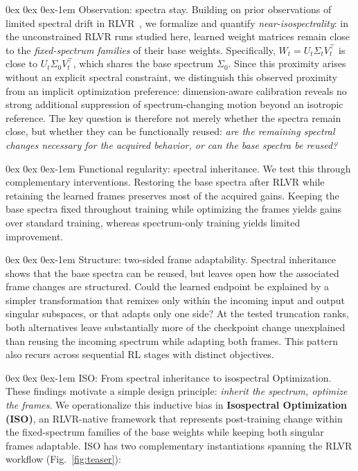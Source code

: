 \documentclass[11pt, a4paper]{utda}
\makeatletter
\renewcommand{\paragraph}{%
  \@startsection{paragraph}{4}%
  {\z@}{0ex \@plus 0ex \@minus 0ex}{-1em}%
  {\normalfont\normalsize\bfseries}%
}
\theoremstyle{plain}
\theoremstyle{definition}
\theoremstyle{remark}
\makeatother
\begin{document}
\paragraph{Observation: spectra stay.}
Building on prior observations of limited spectral drift in
RLVR~\cite{zhu2025path}, we formalize and quantify
\emph{near-isospectrality}: in the unconstrained RLVR runs studied
here, learned weight matrices remain close to the
\emph{fixed-spectrum families} of their base weights.
Specifically, $W_t=U_t\Sigma_tV_t^\top$ is close to
$U_t\Sigma_0V_t^\top$, which shares the base spectrum $\Sigma_0$.
Since this proximity arises without an explicit spectral constraint,
we distinguish this observed proximity from an implicit
optimization preference: dimension-aware calibration reveals
no strong additional suppression of spectrum-changing motion
beyond an isotropic reference.
The key question is therefore not merely whether the spectra
remain close, but whether they can be functionally reused:
\emph{are the remaining spectral changes necessary for the
acquired behavior, or can the base spectra be reused?}


\paragraph{Functional regularity: spectral inheritance.}
We test this through complementary interventions.
Restoring the base spectra after RLVR while retaining the learned frames preserves most of the acquired gains.
Keeping the base spectra fixed throughout training while optimizing the frames yields gains over standard training, whereas spectrum-only training yields limited improvement.

\paragraph{Structure: two-sided frame adaptability.}
Spectral inheritance shows that the base spectra can be reused, but leaves open how the associated frame changes are structured.
Could the learned endpoint be explained by a simpler transformation that remixes only within the incoming input and output singular subspaces, or that adapts only one side?
At the tested truncation ranks, both alternatives leave substantially more of the checkpoint change unexplained than reusing the incoming spectrum while adapting both frames.
This pattern also recurs across sequential RL stages with distinct objectives.


\paragraph{ISO: From spectral inheritance to isospectral Optimization.}
These findings motivate a simple design principle:
\emph{inherit the spectrum, optimize the frames}.
We operationalize this inductive bias in
\textbf{Isospectral Optimization (ISO)}, an RLVR-native framework that represents post-training change within the fixed-spectrum families of the base weights while keeping both singular frames adaptable.
ISO has two complementary instantiations spanning the RLVR workflow
(Fig.~\ref{fig:teaser}):
\end{document}
